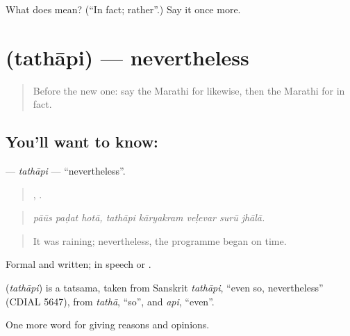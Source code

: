 \begin{tcolorbox}[breakable,colback=teal!4,colframe=teal!35!black,title={Before you move on}]
What does  mean? (\textquotedblleft{}In fact; rather\textquotedblright{}.) Say it once more.
\end{tcolorbox}
\section[\texorpdfstring{\mr{तथापि} (tathāpi)}{तथापि (tathāpi)}]{ (tathāpi) — nevertheless}

\label{lesson:MR-C351-tathapi}



\begin{quote}
Before the new one: say the Marathi for likewise, then the Marathi for in fact.
\end{quote}

\subsection*{You'll want to know: }
\textbf{} — \emph{tathāpi} — \textquotedblleft{}nevertheless\textquotedblright{}.

\begin{quote}
  ,     .
\end{quote}

\begin{quote}
\emph{pāūs paḍat hotā, tathāpi kāryakram veḷevar surū jhālā.}
\end{quote}

\begin{quote}
It was raining; nevertheless, the programme began on time.
\end{quote}

Formal and written; in speech  or .

\begin{cousinweb}
\textbf{} (\emph{tathāpi}) is a tatsama, taken from Sanskrit \emph{tathāpi}, \textquotedblleft{}even so, nevertheless\textquotedblright{} (CDIAL 5647), from \emph{tathā}, \textquotedblleft{}so\textquotedblright{}, and \emph{api}, \textquotedblleft{}even\textquotedblright{}.
\end{cousinweb}

\begin{grammarlens}[title={What you've built}]
One more word for giving reasons and opinions.
\end{grammarlens}

